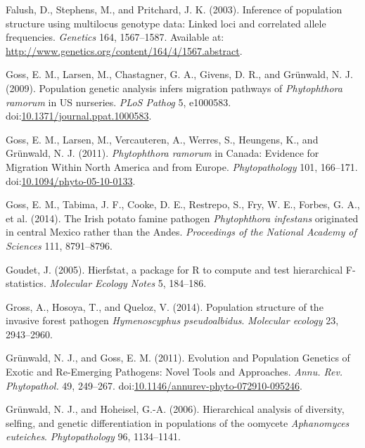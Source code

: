 \documentclass[double,12pt]{beavtex}
\begin{document}
  \hypertarget{ref-Falush01082003}{}
  Falush, D., Stephens, M., and Pritchard, J. K. (2003). Inference of
  population structure using multilocus genotype data: Linked loci and
  correlated allele frequencies. \emph{Genetics} 164, 1567--1587.
  Available at: \url{http://www.genetics.org/content/164/4/1567.abstract}.
  
  \hypertarget{ref-goss2009population}{}
  Goss, E. M., Larsen, M., Chastagner, G. A., Givens, D. R., and Grünwald,
  N. J. (2009). Population genetic analysis infers migration pathways of
  \emph{Phytophthora ramorum} in US nurseries. \emph{PLoS Pathog} 5,
  e1000583.
  doi:\href{https://doi.org/10.1371/journal.ppat.1000583}{10.1371/journal.ppat.1000583}.
  
  \hypertarget{ref-goss2011phytophthora}{}
  Goss, E. M., Larsen, M., Vercauteren, A., Werres, S., Heungens, K., and
  Grünwald, N. J. (2011). \emph{Phytophthora ramorum} in Canada: Evidence
  for Migration Within North America and from Europe.
  \emph{Phytopathology} 101, 166--171.
  doi:\href{https://doi.org/10.1094/phyto-05-10-0133}{10.1094/phyto-05-10-0133}.
  
  \hypertarget{ref-goss2014irish}{}
  Goss, E. M., Tabima, J. F., Cooke, D. E., Restrepo, S., Fry, W. E.,
  Forbes, G. A., et al. (2014). The Irish potato famine pathogen
  \emph{Phytophthora infestans} originated in central Mexico rather than
  the Andes. \emph{Proceedings of the National Academy of Sciences} 111,
  8791--8796.
  
  \hypertarget{ref-goudet2005hierfstat}{}
  Goudet, J. (2005). Hierfstat, a package for R to compute and test
  hierarchical F-statistics. \emph{Molecular Ecology Notes} 5, 184--186.
  
  \hypertarget{ref-gross2014population}{}
  Gross, A., Hosoya, T., and Queloz, V. (2014). Population structure of
  the invasive forest pathogen \emph{Hymenoscyphus pseudoalbidus}.
  \emph{Molecular ecology} 23, 2943--2960.
  
  \hypertarget{ref-grunwald2011evolution}{}
  Grünwald, N. J., and Goss, E. M. (2011). Evolution and Population
  Genetics of Exotic and Re-Emerging Pathogens: Novel Tools and
  Approaches. \emph{Annu. Rev. Phytopathol.} 49, 249--267.
  doi:\href{https://doi.org/10.1146/annurev-phyto-072910-095246}{10.1146/annurev-phyto-072910-095246}.
  
  \hypertarget{ref-grunwald2006hierarchical}{}
  Grünwald, N. J., and Hoheisel, G.-A. (2006). Hierarchical analysis of
  diversity, selfing, and genetic differentiation in populations of the
  oomycete \emph{Aphanomyces euteiches}. \emph{Phytopathology} 96,
  1134--1141.
  
\end{document}
